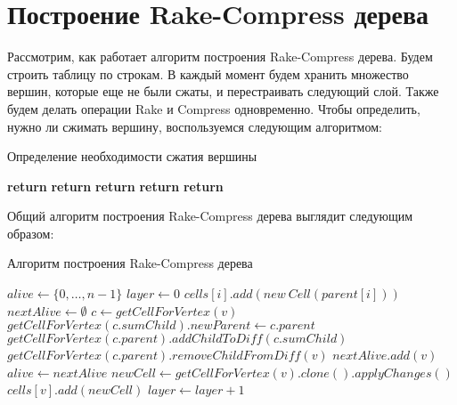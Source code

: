 \FloatBarrier
\section{Построение Rake-Compress дерева}   

Рассмотрим, как работает алгоритм построения Rake-Compress дерева. Будем строить таблицу по строкам.
В каждый момент будем хранить множество вершин, которые еще не были сжаты, и перестраивать следующий слой.
Также будем делать операции Rake и Compress одновременно. Чтобы определить, нужно ли сжимать вершину, 
воспользуемся следующим алгоритмом:

\FloatBarrier
\begin{algorithm}
\caption{Определение необходимости сжатия вершины}\label{algo:check_rake_compress}
\begin{algorithmic}[1]
		\State \textbf{return} \algorithmictrue {}
	\EndIf
		\State \textbf{return} \algorithmicfalse
	\EndIf
		\State \textbf{return} \algorithmicfalse {}
	\EndIf
		\State \textbf{return} \algorithmictrue
	\EndIf
	\State \textbf{return} \algorithmicfalse
\EndProcedure

\end{algorithmic}
\end{algorithm}

Общий алгоритм построения Rake-Compress дерева выглядит следующим образом:

\FloatBarrier
\begin{algorithm}
\caption{Алгоритм построения Rake-Compress дерева}\label{algo:building_rc}
\begin{algorithmic}[1]
\State $alive \gets \{0, \ldots, n - 1\}$
\State $layer \gets 0$
	\State $cells[i].add(new \ Cell(parent[i]))$ 
\EndFor
{}
	\State $nextAlive \gets \emptyset$
		\State $c \gets getCellForVertex(v)$
				\State $getCellForVertex(c.sumChild).newParent \gets c.parent$
				\State $getCellForVertex(c.parent).addChildToDiff(c.sumChild)$
			\EndIf
				\State $getCellForVertex(c.parent).removeChildFromDiff(v)$
			\EndIf
		\Else
			\State $nextAlive.add(v)$
		\EndIf
	\EndFor
	\State $alive \gets nextAlive$
		\State $newCell \gets getCellForVertex(v).clone().applyChanges()$ 
		\State $cells[v].add(newCell)$
	\EndFor
	\State $layer \gets layer + 1$
\EndWhile
\end{algorithmic}
\end{algorithm}

